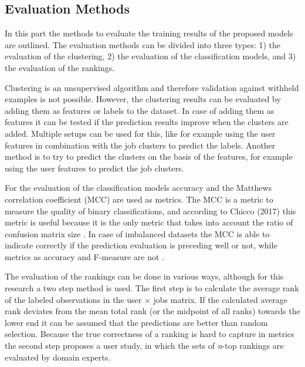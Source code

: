 \subsection{Evaluation Methods}
\label{ssec:eval}

In this part the methods to evaluate the training results of the proposed models are outlined.
The evaluation methods can be divided into three types: 1) the evaluation of the clustering, 2) the evaluation of the classification models, and 3) the evaluation of the rankings.

Clustering is an unsupervised algorithm and therefore validation against withheld examples is not possible.
However, the clustering results can be evaluated by adding them as features or labels to the dataset.
In case of adding them as features it can be tested if the prediction results improve when the clusters are added.
Multiple setups can be used for this, like for example using the user features in combination with the job clusters to predict the labels.
Another method is to try to predict the clusters on the basis of the features, for example using the user features to predict the job clusters. 

For the evaluation of the classification models accuracy and the Matthews correlation coefficient (MCC) \cite{matthews1975comparison} are used as metrics.
The MCC is a metric to measure the quality of binary classifications, and according to Chicco (2017) this metric is useful because it is the only metric that takes into account the ratio of confusion matrix size \cite{chicco2017ten}.
In case of imbalanced datasets the MCC is able to indicate correctly if the prediction evaluation is preceding well or not, while metrics as accuracy and F-measure are not \cite{boughorbel2017optimal}.

The evaluation of the rankings can be done in various ways, although for this research a two step method is used. 
The first step is to calculate the average rank of the labeled observations in the user $\times$ jobs matrix.
If the calculated average rank deviates from the mean total rank (or the midpoint of all ranks) towards the lower end it can be assumed that the predictions are better than random selection. 
Because the true correctness of a ranking is hard to capture in metrics the second step proposes a user study, in which the sets of \textit{n}-top rankings are evaluated by domain experts. 